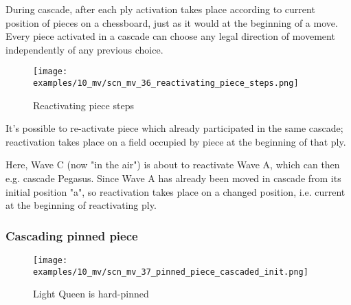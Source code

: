 During cascade, after each ply activation takes place according to current position
of pieces on a chessboard, just as it would at the beginning of a move. Every piece
activated in a cascade can choose any legal direction of movement independently of
any previous choice.

\clearpage %

\vspace*{-2.1\baselineskip}
\noindent
\begin{figure}[!h]
\texttt{[image: examples/10\_mv/scn\_mv\_36\_reactivating\_piece\_steps.png]}
\vspace*{-1.3\baselineskip}
\caption{Reactivating piece steps}
\label{fig:scn_mv_36_reactivating_piece_steps}
\end{figure}

\vspace*{-0.3\baselineskip}
It's possible to re-activate piece which already participated in the same cascade;
reactivation takes place on a field occupied by piece at the beginning of that ply.

Here, Wave C (now "in the air") is about to reactivate Wave A, which can then e.g.
cascade Pegasus. Since Wave A has already been moved in cascade from its initial
position "a", so reactivation takes place on a changed position, i.e. current at
the beginning of reactivating ply.

\clearpage %

\subsubsection*{Cascading pinned piece}
\label{sec:Miranda's veil/Wave/Cascading Waves/Cascading pinned piece}

\vspace*{-1.5\baselineskip}
\noindent
\begin{figure}[!h]
\texttt{[image: examples/10\_mv/scn\_mv\_37\_pinned\_piece\_cascaded\_init.png]}
\vspace*{-1.3\baselineskip}
\caption{Light Queen is hard-pinned}
\label{fig:scn_mv_37_pinned_piece_cascaded_init}
\end{figure}

